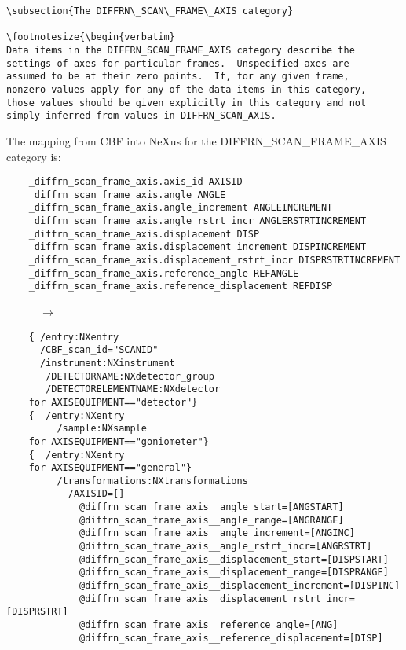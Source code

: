 \documentclass[11pt]{article}
\begin{document}
{{{\begin{verbatim}
\subsection{The DIFFRN\_SCAN\_FRAME\_AXIS category}

\footnotesize{\begin{verbatim}
Data items in the DIFFRN_SCAN_FRAME_AXIS category describe the
settings of axes for particular frames.  Unspecified axes are
assumed to be at their zero points.  If, for any given frame,
nonzero values apply for any of the data items in this category,
those values should be given explicitly in this category and not
simply inferred from values in DIFFRN_SCAN_AXIS.
\end{verbatim}

The mapping from CBF into NeXus for the DIFFRN\_SCAN\_FRAME\_AXIS category is:

\begin{verbatim}     
    _diffrn_scan_frame_axis.axis_id AXISID
    _diffrn_scan_frame_axis.angle ANGLE
    _diffrn_scan_frame_axis.angle_increment ANGLEINCREMENT
    _diffrn_scan_frame_axis.angle_rstrt_incr ANGLERSTRTINCREMENT
    _diffrn_scan_frame_axis.displacement DISP 
    _diffrn_scan_frame_axis.displacement_increment DISPINCREMENT
    _diffrn_scan_frame_axis.displacement_rstrt_incr DISPRSTRTINCREMENT
    _diffrn_scan_frame_axis.reference_angle REFANGLE
    _diffrn_scan_frame_axis.reference_displacement REFDISP
\end{verbatim}
~~~~~~{\bf{}$\rightarrow$}\\
\begin{verbatim}
    { /entry:NXentry
      /CBF_scan_id="SCANID"
      /instrument:NXinstrument
       /DETECTORNAME:NXdetector_group
       /DETECTORELEMENTNAME:NXdetector
    for AXISEQUIPMENT=="detector"}
    {  /entry:NXentry
         /sample:NXsample
    for AXISEQUIPMENT=="goniometer"}
    {  /entry:NXentry
    for AXISEQUIPMENT=="general"}
         /transformations:NXtransformations
           /AXISID=[]
             @diffrn_scan_frame_axis__angle_start=[ANGSTART]
             @diffrn_scan_frame_axis__angle_range=[ANGRANGE]
             @diffrn_scan_frame_axis__angle_increment=[ANGINC]
             @diffrn_scan_frame_axis__angle_rstrt_incr=[ANGRSTRT]
             @diffrn_scan_frame_axis__displacement_start=[DISPSTART]
             @diffrn_scan_frame_axis__displacement_range=[DISPRANGE]
             @diffrn_scan_frame_axis__displacement_increment=[DISPINC]
             @diffrn_scan_frame_axis__displacement_rstrt_incr=[DISPRSTRT]
             @diffrn_scan_frame_axis__reference_angle=[ANG]
             @diffrn_scan_frame_axis__reference_displacement=[DISP]



\end{verbatim}}}}
\end{document}
